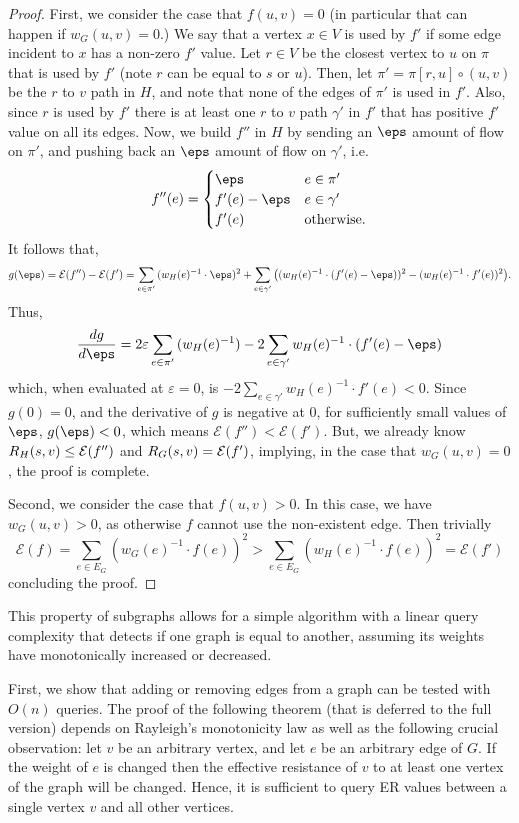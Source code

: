 {\begin{proof}
    First, we consider the case that $f(u,v) = 0$ (in particular that can happen if $w_G(u,v) = 0$.)
    We say that a vertex $x\in V$ is used by $f'$ if some edge incident to $x$ has a non-zero $f'$ value.  Let $r\in V$ be the closest vertex to $u$ on $\pi$ that is used by $f'$ (note $r$ can be equal to $s$ or $u$).  Then, let $\pi' = \pi[r,u]\circ (u,v)$ be the $r$ to $v$ path in $H$, and note that none of the edges of $\pi'$ is used in $f'$.  Also, since $r$ is used by $f'$ there is at least one $r$ to $v$ path $\gamma'$ in $f'$ that has positive $f'$ value on all its edges.  Now, we build $f''$ in $H$ by sending an $\eps$ amount of flow on $\pi'$, and pushing back an $\eps$ amount of flow on $\gamma'$, i.e.
    \[
        f''(e) = \begin{cases}
            \eps & e \in \pi' \\
            f'(e)-\eps & e \in \gamma' \\
            f'(e) & \text{otherwise.}
        \end{cases}
    \]
    It follows that,
    \[
    g(\eps) = \mathcal{E}(f'') - \mathcal{E}(f') = \sum_{e\in\pi'}{(w_H(e)^{-1} \cdot \eps)^2} +\sum_{e\in\gamma'}{ \left((w_H(e)^{-1}\cdot(f'(e)-\eps))^2 - (w_H(e)^{-1}\cdot f'(e))^2\right)}.
    \]
    Thus,
    \[
    \frac{dg}{d\eps}=2\varepsilon\sum_{e\in\pi'}{(w_H(e)^{-1})} - 2\sum_{e\in\gamma'}{w_H(e)^{-1}\cdot(f'(e)-\eps)}\]
    which, when evaluated at $\varepsilon = 0$, is $-2 \sum_{e \in \gamma'}w_H(e)^{-1} \cdot f'(e) < 0$.
    Since $g(0) = 0$, and the derivative of $g$ is negative at $0$, for sufficiently small values of $\eps$, $g(\eps) < 0$, which means $\mathcal{E}(f'') < \mathcal{E}(f')$.  But, we already know $R_H(s,v) \leq \mathcal{E}(f'')$ and $R_G(s,v) = \mathcal{E}(f')$, implying, in the case that $w_G(u,v)=0$, the proof is complete.

    Second, we consider the case that $f(u,v) > 0$.  In this case, we have $w_G(u,v) > 0$, as otherwise $f$ cannot use the non-existent edge.
    Then trivially \[\mathcal{E}(f) = \sum_{e \in E_G} (w_G(e)^{-1} \cdot f(e))^2 >  \sum_{e \in E_G} (w_H(e)^{-1} \cdot f(e))^2 = \mathcal{E}(f')\]
    concluding the proof.
\end{proof}

This property of subgraphs allows for a simple algorithm with a linear query complexity that detects if one graph is equal to another, assuming its weights have monotonically increased or decreased. 
}{
First, we show that adding or removing edges from a graph can be tested with $O(n)$ queries.  The proof of the following theorem (that is deferred to the full version) depends on Rayleigh's monotonicity law as well as the following crucial observation: let $v$ be an arbitrary vertex, and let $e$ be an arbitrary edge of $G$.  If the weight of $e$ is changed then the effective resistance of $v$ to at least one vertex of the graph will be changed. Hence, it is sufficient to query ER values between a single vertex $v$ and all other vertices.
}
